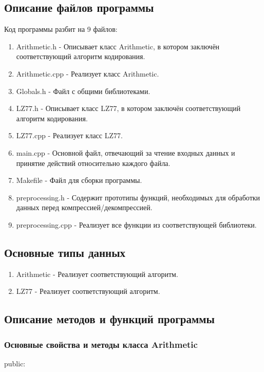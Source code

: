 \documentclass[12pt]{article}
\begin{document}
\subsection*{Описание файлов программы}

Код программы разбит на 9 файлов:

\begin{enumerate}
	\item Arithmetic.h - Описывает класс Arithmetic, в котором заключён соответствующий алгоритм кодирования. 
	\item Arithmetic.cpp - Реализует класс Arithmetic.
	\item Globals.h - Файл с общими библиотеками.
	\item LZ77.h - Описывает класс LZ77, в котором заключён соответствующий алгоритм кодирования.
	\item LZ77.cpp - Реализует класс LZ77.
	\item main.cpp - Основной файл, отвечающий за чтение входных данных и принятие действий относительно каждого файла.
	\item Makefile - Файл для сборки программы.
	\item preprocessing.h - Содержит прототипы функций, необходимых для обработки данных перед компрессией/декомпрессией.
	\item preprocessing.cpp - Реализует все функции из соответствующей библиотеки.
\end{enumerate}

\subsection*{Основные типы данных}

\begin{enumerate}
	\item Arithmetic - Реализует соответствующий алгоритм.
	\item LZ77 - Реализует соответствующий алгоритм.
\end{enumerate}

\subsection*{Описание методов и функций программы}
 
\subsubsection*{Основные свойства и методы класса Arithmetic}
\noindent
public:
\end{document}
